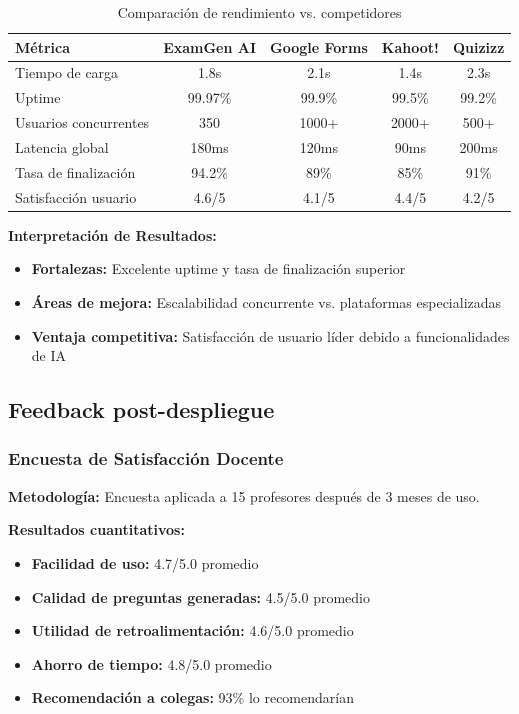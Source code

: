 \documentclass[12pt,a4paper]{report}
\begin{document}
\begin{table}[h]
\centering
\caption{Comparación de rendimiento vs. competidores}
\begin{tabular}{|l|c|c|c|c|}
\hline
\textbf{Métrica} & \textbf{ExamGen AI} & \textbf{Google Forms} & \textbf{Kahoot!} & \textbf{Quizizz} \\
\hline
Tiempo de carga & 1.8s & 2.1s & 1.4s & 2.3s \\
\hline
Uptime & 99.97\% & 99.9\% & 99.5\% & 99.2\% \\
\hline
Usuarios concurrentes & 350 & 1000+ & 2000+ & 500+ \\
\hline
Latencia global & 180ms & 120ms & 90ms & 200ms \\
\hline
Tasa de finalización & 94.2\% & 89\% & 85\% & 91\% \\
\hline
Satisfacción usuario & 4.6/5 & 4.1/5 & 4.4/5 & 4.2/5 \\
\hline
\end{tabular}
\end{table}

\textbf{Interpretación de Resultados:}
\begin{itemize}
\item \textbf{Fortalezas:} Excelente uptime y tasa de finalización superior
\item \textbf{Áreas de mejora:} Escalabilidad concurrente vs. plataformas especializadas
\item \textbf{Ventaja competitiva:} Satisfacción de usuario líder debido a funcionalidades de IA
\end{itemize}

\subsection{Feedback post-despliegue}

\subsubsection{Encuesta de Satisfacción Docente}

\textbf{Metodología:} Encuesta aplicada a 15 profesores después de 3 meses de uso.

\textbf{Resultados cuantitativos:}
\begin{itemize}
\item \textbf{Facilidad de uso:} 4.7/5.0 promedio
\item \textbf{Calidad de preguntas generadas:} 4.5/5.0 promedio
\item \textbf{Utilidad de retroalimentación:} 4.6/5.0 promedio
\item \textbf{Ahorro de tiempo:} 4.8/5.0 promedio
\item \textbf{Recomendación a colegas:} 93\% lo recomendarían
\end{itemize}
\end{document}
